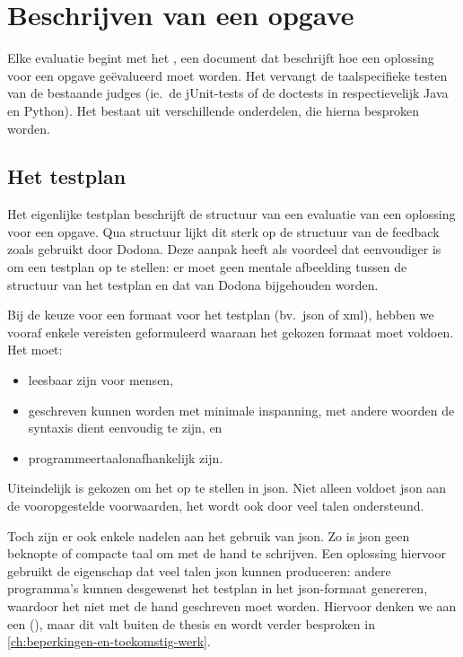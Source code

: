 \section{Beschrijven van een opgave}\label{sec:testplan}

Elke evaluatie begint met het , een document dat beschrijft hoe een oplossing voor een opgave geëvalueerd moet worden.
Het vervangt de taalspecifieke testen van de bestaande judges (ie.\ de jUnit-tests of de doctests in respectievelijk Java en Python).
Het bestaat uit verschillende onderdelen, die hierna besproken worden.

\subsection{Het testplan}\label{subsec:het-testplan}

Het eigenlijke testplan beschrijft de structuur van een evaluatie van een oplossing voor een opgave.
Qua structuur lijkt dit sterk op de structuur van de feedback zoals gebruikt door Dodona.
Deze aanpak heeft als voordeel dat eenvoudiger is om een testplan op te stellen: er moet geen mentale afbeelding tussen de structuur van het testplan en dat van Dodona bijgehouden worden.

Bij de keuze voor een formaat voor het testplan (bv.\ json of xml), hebben we vooraf enkele vereisten geformuleerd waaraan het gekozen formaat moet voldoen.
Het moet:

\begin{itemize}
    \item leesbaar zijn voor mensen,
    \item geschreven kunnen worden met minimale inspanning, met andere woorden de syntaxis dient eenvoudig te zijn, en
    \item programmeertaalonafhankelijk zijn.
\end{itemize}

Uiteindelijk is gekozen om het op te stellen in json.
Niet alleen voldoet json aan de vooropgestelde voorwaarden, het wordt ook door veel talen ondersteund.

Toch zijn er ook enkele nadelen aan het gebruik van json.
Zo is json geen beknopte of compacte taal om met de hand te schrijven.
Een oplossing hiervoor gebruikt de eigenschap dat veel talen json kunnen produceren: andere programma's kunnen desgewenst het testplan in het json-formaat genereren, waardoor het niet met de hand geschreven moet worden.
Hiervoor denken we aan een  (), maar dit valt buiten de thesis en wordt verder besproken in \cref{ch:beperkingen-en-toekomstig-werk}.

